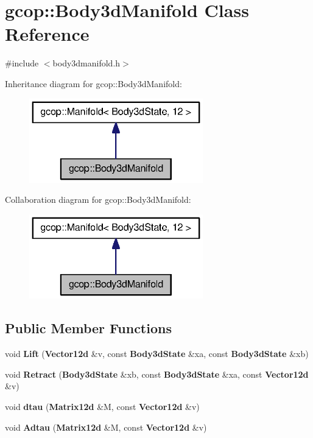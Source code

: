 \section{gcop\-:\-:\-Body3d\-Manifold \-Class \-Reference}
\label{classgcop_1_1Body3dManifold}


{\ttfamily \#include $<$body3dmanifold.\-h$>$}



\-Inheritance diagram for gcop\-:\-:\-Body3d\-Manifold\-:\nopagebreak
\begin{figure}[H]
\begin{center}
\leavevmode
\includegraphics[width=214pt]{classgcop_1_1Body3dManifold__inherit__graph}
\end{center}
\end{figure}


\-Collaboration diagram for gcop\-:\-:\-Body3d\-Manifold\-:\nopagebreak
\begin{figure}[H]
\begin{center}
\leavevmode
\includegraphics[width=214pt]{classgcop_1_1Body3dManifold__coll__graph}
\end{center}
\end{figure}
\subsection*{\-Public \-Member \-Functions}
\begin{DoxyCompactItemize}
\item 
void {\bf \-Lift} ({\bf \-Vector12d} \&v, const {\bf \-Body3d\-State} \&xa, const {\bf \-Body3d\-State} \&xb)
\item 
void {\bf \-Retract} ({\bf \-Body3d\-State} \&xb, const {\bf \-Body3d\-State} \&xa, const {\bf \-Vector12d} \&v)
\item 
void {\bf dtau} ({\bf \-Matrix12d} \&\-M, const {\bf \-Vector12d} \&v)
\item 
void {\bf \-Adtau} ({\bf \-Matrix12d} \&\-M, const {\bf \-Vector12d} \&v)
\end{DoxyCompactItemize}
